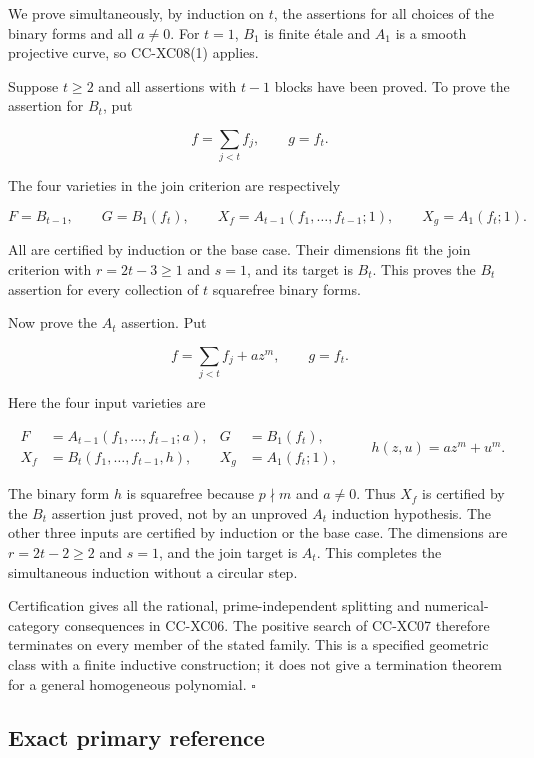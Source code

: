We prove simultaneously, by induction on \(t\), the assertions for all
choices of the binary forms and all \(a\ne0\). For \(t=1\), \(B_1\) is
finite étale and \(A_1\) is a smooth projective curve, so CC-XC08(1)
applies.

Suppose \(t\ge2\) and all assertions with \(t-1\) blocks have been
proved. To prove the assertion for \(B_t\), put

\[
 f=\sum_{j<t}f_j,\qquad g=f_t.
\]

The four varieties in the join criterion are respectively

\[
 F=B_{t-1},\qquad G=B_1(f_t),\qquad
 X_f=A_{t-1}(f_1,\ldots,f_{t-1};1),\qquad
 X_g=A_1(f_t;1).
 \tag{CC-XC.29}
\]

All are certified by induction or the base case. Their dimensions fit
the join criterion with \(r=2t-3\ge1\) and \(s=1\), and its target is
\(B_t\). This proves the \(B_t\) assertion for every collection of \(t\)
squarefree binary forms.

Now prove the \(A_t\) assertion. Put

\[
 f=\sum_{j<t}f_j+a z^m,\qquad g=f_t.
\]

Here the four input varieties are

\[
 \begin{aligned}
 F&=A_{t-1}(f_1,\ldots,f_{t-1};a),&
 G&=B_1(f_t),\\
 X_f&=B_t(f_1,\ldots,f_{t-1},h),&
 X_g&=A_1(f_t;1),
 \end{aligned}
 \qquad h(z,u)=a z^m+u^m.
 \tag{CC-XC.30}
\]

The binary form \(h\) is squarefree because \(p\nmid m\) and \(a\ne0\).
Thus \(X_f\) is certified by the \(B_t\) assertion just proved, not by
an unproved \(A_t\) induction hypothesis. The other three inputs are
certified by induction or the base case. The dimensions are
\(r=2t-2\ge2\) and \(s=1\), and the join target is \(A_t\). This
completes the simultaneous induction without a circular step.

Certification gives all the rational, prime-independent splitting and
numerical-category consequences in CC-XC06. The positive search of
CC-XC07 therefore terminates on every member of the stated family. This
is a specified geometric class with a finite inductive construction; it
does not give a termination theorem for a general homogeneous
polynomial. \(\square\)

\subsection{Exact primary reference}\label{exact-primary-reference}

